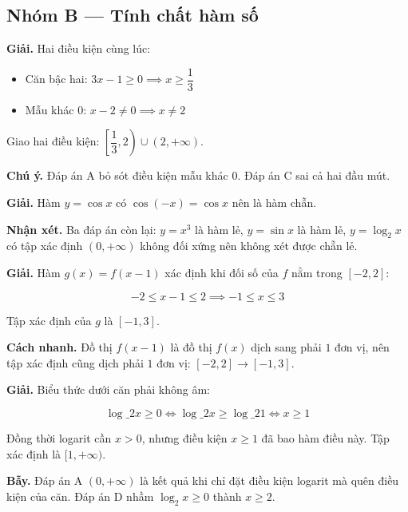 \documentclass[11pt, a4paper]{article}
\begin{document}
\subsection*{Nhóm B — Tính chất hàm số}

\begin{dapan}[14 — Đáp án D]
\textbf{Giải.} Hai điều kiện cùng lúc:

\begin{itemize}[leftmargin=1.4em, itemsep=2pt]
\item Căn bậc hai: $3x - 1 \ge 0 \implies x \ge \dfrac{1}{3}$
\item Mẫu khác $0$: $x - 2 \ne 0 \implies x \ne 2$
\end{itemize}


Giao hai điều kiện: $\left[\dfrac{1}{3}, 2\right) \cup (2, +\infty)$.

\textbf{Chú ý.} Đáp án A bỏ sót điều kiện mẫu khác $0$. Đáp án C sai cả hai đầu mút.
\end{dapan}

\begin{dapan}[15 — Đáp án C]
\textbf{Giải.} Hàm $y = \cos x$ có $\cos(-x) = \cos x$ nên là hàm chẵn.

\textbf{Nhận xét.} Ba đáp án còn lại: $y = x^3$ là hàm lẻ, $y = \sin x$ là hàm lẻ, $y = \log_2 x$ có tập xác định $(0, +\infty)$ không đối xứng nên không xét được chẵn lẻ.
\end{dapan}

\begin{dapan}[16 — Đáp án C]
\textbf{Giải.} Hàm $g(x) = f(x-1)$ xác định khi đối số của $f$ nằm trong $[-2, 2]$:

$$-2 \le x - 1 \le 2 \implies -1 \le x \le 3$$

Tập xác định của $g$ là $[-1, 3]$.

\textbf{Cách nhanh.} Đồ thị $f(x-1)$ là đồ thị $f(x)$ dịch sang phải $1$ đơn vị, nên tập xác định cũng dịch phải $1$ đơn vị: $[-2,2] \to [-1,3]$.
\end{dapan}

\begin{dapan}[17 — Đáp án C]
\textbf{Giải.} Biểu thức dưới căn phải không âm:

$$\log\_2 x \ge 0 \iff \log\_2 x \ge \log\_2 1 \iff x \ge 1$$

Đồng thời logarit cần $x > 0$, nhưng điều kiện $x \ge 1$ đã bao hàm điều này. Tập xác định là $[1, +\infty)$.

\textbf{Bẫy.} Đáp án A $(0, +\infty)$ là kết quả khi chỉ đặt điều kiện logarit mà quên điều kiện của căn. Đáp án D nhầm $\log_2 x \ge 0$ thành $x \ge 2$.
\end{dapan}
\end{document}
